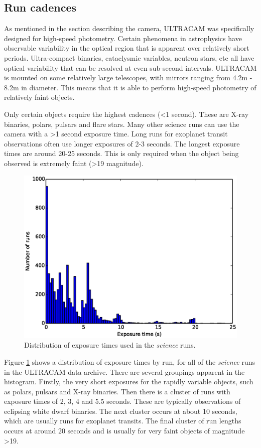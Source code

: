 \subsection{Run cadences}
As mentioned in the section describing the camera, ULTRACAM was specifically designed for high-speed photometry. Certain phenomena in astrophysics have observable variability in the optical region that is apparent over relatively short periods. Ultra-compact binaries, cataclysmic variables, neutron stars, etc all have optical variability that can be resolved at even sub-second intervals. ULTRACAM is mounted on some relatively large telescopes, with mirrors ranging from 4.2m - 8.2m in diameter. This means that it is able to perform high-speed photometry of relatively faint objects. 

Only certain objects require the highest cadences (\textless 1 second). These are X-ray binaries, polars, pulsars and flare stars. Many other science runs can use the camera with a \textgreater 1 second exposure time. Long runs for exoplanet transit observations often use longer exposures of 2-3 seconds. The longest exposure times are around 20-25 seconds. This is only required when the object being observed is extremely faint (\textgreater 19 magnitude).  

\begin{figure}
  \centering
  \includegraphics[width=120mm]{images/cadences_hist0-25.eps}
  \caption{Distribution of exposure times used in the \emph{science} runs.}
  \label{fig:cadences}
\end{figure}

Figure \ref{fig:cadences} shows a distribution of exposure times by run, for all of the \emph{science} runs in the ULTRACAM data archive. There are several groupings apparent in the histogram. Firstly, the very short exposures for the rapidly variable objects, such as polars, pulsars and X-ray binaries. Then there is a cluster of runs with exposure times of 2, 3, 4 and 5.5 seconds. These are typically observations of eclipsing white dwarf binaries. The next cluster occurs at about 10 seconds, which are usually runs for exoplanet transits. The final cluster of run lengths occurs at around 20 seconds and is usually for very faint objects of magnitude \textgreater 19.

